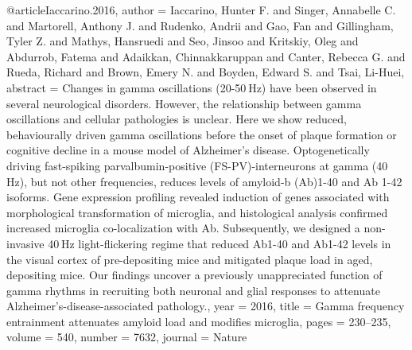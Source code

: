 @article{Iaccarino.2016,
 author = {Iaccarino, Hunter F. and Singer, Annabelle C. and Martorell, Anthony J. and Rudenko, Andrii and Gao, Fan and Gillingham, Tyler Z. and Mathys, Hansruedi and Seo, Jinsoo and Kritskiy, Oleg and Abdurrob, Fatema and Adaikkan, Chinnakkaruppan and Canter, Rebecca G. and Rueda, Richard and Brown, Emery N. and Boyden, Edward S. and Tsai, Li-Huei},
 abstract = {Changes in gamma oscillations (20-50 Hz) have been observed in several neurological disorders. However, the relationship between gamma oscillations and cellular pathologies is unclear. Here we show reduced, behaviourally driven gamma oscillations before the onset of plaque formation or cognitive decline in a mouse model of Alzheimer's disease. Optogenetically driving fast-spiking parvalbumin-positive (FS-PV)-interneurons at gamma (40 Hz), but not other frequencies, reduces levels of amyloid-\textgreek{b} (A\textgreek{b})1-40 and A\textgreek{b} 1-42 isoforms. Gene expression profiling revealed induction of genes associated with morphological transformation of microglia, and histological analysis confirmed increased microglia co-localization with A\textgreek{b}. Subsequently, we designed a non-invasive 40 Hz light-flickering regime that reduced A\textgreek{b}1-40 and A\textgreek{b}1-42 levels in the visual cortex of pre-depositing mice and mitigated plaque load in aged, depositing mice. Our findings uncover a previously unappreciated function of gamma rhythms in recruiting both neuronal and glial responses to attenuate Alzheimer's-disease-associated pathology.},
 year = {2016},
 title = {{Gamma frequency entrainment attenuates amyloid load and modifies microglia}},
 pages = {230--235},
 volume = {540},
 number = {7632},
 journal = {{Nature}}
}


